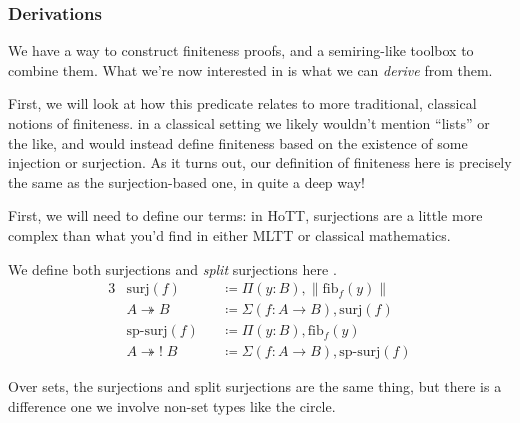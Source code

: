 \subsubsection{Derivations}
We have a way to construct finiteness proofs, and a semiring-like toolbox to
combine them.
What we're now interested in is what we can \emph{derive} from them.

First, we will look at how this predicate relates to more traditional, classical
notions of finiteness.
in a classical setting we likely wouldn't mention ``lists'' or the like, and
would instead define finiteness based on the existence of some injection or
surjection.
As it turns out, our definition of finiteness here is precisely the same as the
surjection-based one, in quite a deep way!

First, we will need to define our terms: in HoTT, surjections are a little more
complex than what you'd find in either MLTT or classical mathematics.
\begin{definition}[Surjections] \label{surjections}
  We define both surjections and \emph{split} surjections here \cite[definition
  4.6.1]{hottbook}.
  \begin{alignat}{3}
    &\text{surj}(f)             &&\coloneqq \Pi(y : B) , \lVert \text{fib}_f(y) \rVert \\
    &A \twoheadrightarrow B     &&\coloneqq \Sigma (f : A \rightarrow B) , \text{surj}(f) \label{surj-arrow-eqn} \\
    &\text{sp-surj}(f)          &&\coloneqq \Pi(y : B) , \text{fib}_f(y) \label{sp-surj-eqn} \\
    &A \twoheadrightarrow! \; B &&\coloneqq \Sigma (f : A \rightarrow B) , \text{sp-surj}(f) \label{sp-surj-arrow-eqn}
  \end{alignat}
\end{definition}
Over sets, the surjections and split surjections are the same thing, but there
is a difference one we involve non-set types like the circle.

